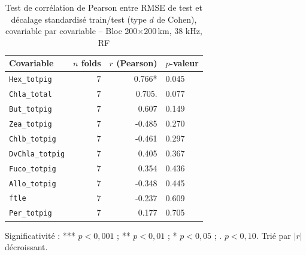 \begin{table}[htbp]
\centering
\caption{Test de corr\'elation de Pearson entre RMSE de test et d\'ecalage standardis\'e train/test (type $d$ de Cohen), covariable par covariable -- Bloc 200$\times$200\,km, 38 kHz, RF}
\label{tab:covariate_distance_significance_blocked_spatial_200x200km}
\small
\begin{tabular}{lrrl}
\toprule
Covariable & $n$ folds & $r$ (Pearson) & $p$-valeur \\
\midrule
\texttt{Hex_totpig} & 7 & 0.766* & 0.045 \\
\texttt{Chla_total} & 7 & 0.705. & 0.077 \\
\texttt{But_totpig} & 7 & 0.607 & 0.149 \\
\texttt{Zea_totpig} & 7 & -0.485 & 0.270 \\
\texttt{Chlb_totpig} & 7 & -0.461 & 0.297 \\
\texttt{DvChla_totpig} & 7 & 0.405 & 0.367 \\
\texttt{Fuco_totpig} & 7 & 0.354 & 0.436 \\
\texttt{Allo_totpig} & 7 & -0.348 & 0.445 \\
\texttt{ftle} & 7 & -0.237 & 0.609 \\
\texttt{Per_totpig} & 7 & 0.177 & 0.705 \\
\bottomrule
\end{tabular}
\vspace{0.3em}
{\footnotesize Significativit\'e : *** $p<0{,}001$ ; ** $p<0{,}01$ ; * $p<0{,}05$ ; . $p<0{,}10$. Tri\'e par $|r|$ d\'ecroissant.}
\end{table}
